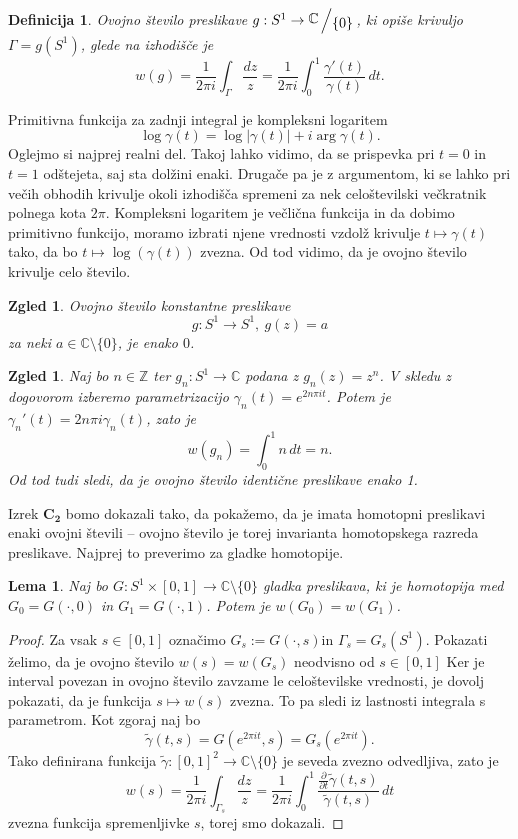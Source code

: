 \documentclass[10pt, a4paper]{article}
\newtheorem{defi}[izr]{Definicija}
\newenvironment{noticeB}{%
  \tcolorbox[%
  notitle,
  empty,
  enhanced,  %
  breakable,
  coltext=black,
  colback=white, 
  fontupper=\rmfamily,
  noparskip,
  sharp corners,
  boxrule=-1pt,  %
  frame hidden,
  left=7pt,  %
  right=7pt,
  top=5pt,
  bottom=5pt,
  before skip=2.5ex plus 2pt,
  after skip=2.5ex plus 2pt,
  borderline west = {1.5pt}{-0.1pt}{blue!30!black}, %
  overlay unbroken and last={%
    \draw[color=black, line width=1.25pt]
    ($(frame.south west)+(1.pt, -0.1pt)$) -- ++(2em, 0);
  }
  ]}
{\endtcolorbox}
\newenvironment{definicija}{\begin{noticeB}\begin{defi}}{%
\end{defi}\end{noticeB}}
\newtheorem{zgled}[izr]{Zgled}
\newtheorem{lema}[izr]{Lema}
\newenvironment{noticeC}{%
  \tcolorbox[%
  notitle,
  empty,
  enhanced,  %
  breakable,
  coltext=black, 
  fontupper=\rmfamily,
  noparskip,
  sharp corners,
  boxrule=-1pt,  %
  frame hidden,
  left=7pt,  %
  right=7pt,
  top=5pt,
  bottom=5pt,
  before skip=2.5ex plus 2pt,
  after skip=2.5ex plus 2pt,
  overlay unbroken and last={%
  },
  ]}
{\endtcolorbox}
\newenvironment{dokaz}%
  {\begin{noticeC}\begin{proof}}%
  {\end{proof}\end{noticeC}}
\newcommand{\Z}{\mathbb {Z}}
\newcommand{\C}{\mathbb {C}}
\newcommand{\quot}[2]{{\raisebox{0.1em}{$#1$}\left/\raisebox{-0.2em}{$#2$}\right.}}
\begin{document}
\begin{definicija}
  Ovojno število preslikave $g: S^1 \to \quot{\C}{\{0\}}$, ki opiše krivuljo $\Gamma = g(S^1)$, glede na izhodišče 
  je 
  $$w(g) = \frac{1}{2 \pi i} \int_{\Gamma} \frac{dz}{z} = \frac{1}{2 \pi i} \int_0 ^1 \frac{\gamma'(t)}{\gamma(t)}\, dt.$$
\end{definicija}

Primitivna funkcija za zadnji integral je kompleksni logaritem 
$$\log \gamma(t) = \log |\gamma(t)| + i \arg \gamma(t).$$
Oglejmo si najprej realni del. Takoj lahko vidimo, da se prispevka pri 
$t = 0$ in $t = 1$ odštejeta, saj sta dolžini enaki.
Drugače pa je z argumentom, ki se lahko pri večih obhodih
krivulje okoli izhodišča spremeni za nek celoštevilski večkratnik 
polnega kota $2 \pi$. Kompleksni logaritem je večlična funkcija in 
da dobimo primitivno funkcijo, moramo izbrati njene vrednosti vzdolž krivulje 
$t \mapsto \gamma(t)$ tako, da bo $t \mapsto \log(\gamma(t))$ zvezna.
Od tod vidimo, da je ovojno število krivulje celo število.

\begin{zgled}
  Ovojno število konstantne preslikave $$g: S^1 \to S^1,\ g(z) = a$$
  za neki $a \in \C \setminus \{0\}$, je enako $0$.
\end{zgled}

\begin{zgled}
  Naj bo $n \in \Z$ ter $g_n : S^1 \to \C$ podana z $g_n(z) = z^n$.
  V skledu z dogovorom izberemo parametrizacijo $\gamma_n(t) = e^{2 n \pi i t}$.
  Potem je $\gamma_n '(t) = 2 n \pi i \gamma_n (t)$, zato je 
  $$w (g_n) = \int_0 ^1 n\, dt = n.$$
  Od tod tudi sledi, da je ovojno število identične preslikave enako 1.
\end{zgled}

Izrek $\mathbf{C_2}$ bomo dokazali tako, da pokažemo, da je imata 
homotopni preslikavi enaki ovojni števili -- ovojno število je torej 
invarianta homotopskega razreda preslikave.
Najprej to preverimo za gladke homotopije.

\begin{lema}
  Naj bo $G: S^1 \times [0, 1] \to \C \setminus \{0\}$ gladka preslikava, ki je homotopija med 
  $G_0 = G(\cdot , 0)$ in $G_1 = G(\cdot , 1)$. Potem je $w (G_0) = w (G_1)$.
\end{lema}

\begin{dokaz}
  Za vsak $s \in [0, 1]$ označimo $G_s := G(\cdot, s)$in $\Gamma_s = G_s (S^1)$.
  Pokazati želimo, da je ovojno število $w(s) = w(G_s)$ neodvisno od $s \in [0, 1]$
  Ker je interval povezan in ovojno število zavzame le celoštevilske vrednosti,
  je dovolj pokazati, da je funkcija $s \mapsto w(s)$ zvezna. To pa sledi iz lastnosti 
  integrala s parametrom. Kot zgoraj naj bo 
  $$\widetilde{\gamma} (t, s) = G(e^{2 \pi i t}, s) = G_s (e^{2 \pi i t}).$$
  Tako definirana funkcija $\widetilde{\gamma}: [0, 1]^2 \to \C \setminus \{0\}$ je seveda zvezno odvedljiva,
  zato je 
  $$w(s) = \frac{1}{2 \pi i} \int_{\Gamma_s} \frac{dz}{z} = \frac{1}{2 \pi i} \int_0 ^1 \frac{\frac{\partial}{\partial t} \widetilde{\gamma} (t, s)}{\widetilde{\gamma} (t, s)}\, dt$$
  zvezna funkcija spremenljivke $s$, torej smo dokazali. 
\end{dokaz}
\end{document}
